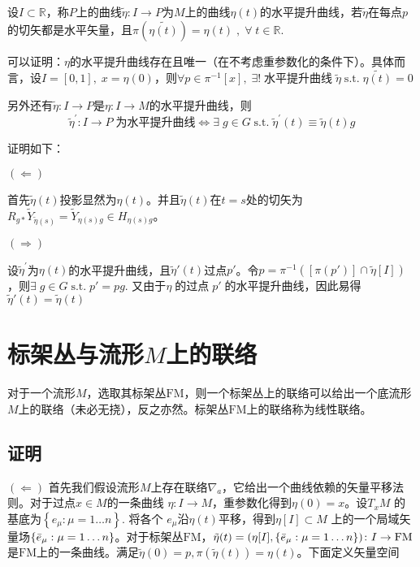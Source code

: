 \documentclass{ctexbook}
\begin{document}
设$I\subset\mathbb{R}$，称$P$上的曲线$\tilde{\eta}\colon I\to P$为$M$上的曲线$\eta(t)$的水平提升曲线，若$\tilde{\eta}$在每点$p$的切矢都是水平矢量，且$\pi(\tilde{\eta(t)})=\eta(t)\;,\;\forall\;t\in\mathbb{R}$.

可以证明：$\eta$的水平提升曲线存在且唯一（在不考虑重参数化的条件下）。具体而言，设$I=[0,1],\;x=\eta(0)$，则$\forall p\in\pi^{-1}[x],\;\exists!\;\text{水平提升曲线}\;\tilde{\eta}\;\text{s.t.}\;\tilde{\eta(t)}=0$

另外还有$\tilde{\eta}\colon I\to P$是$\eta\colon I\to M$的水平提升曲线，则
\begin{equation}
    \tilde{\eta}^{'}\colon I\to P\;\text{为水平提升曲线}\Leftrightarrow\exists\;g\in G\;\text{s.t.}\;\tilde{\eta}^{'}(t)\equiv\tilde{\eta}(t)g
\end{equation}

证明如下：

$\left(\Leftarrow\right)$ 

首先$\tilde{\eta}(t)$投影显然为$\eta(t)$。并且$\tilde{\eta}(t)$在$t=s$处的切矢为$R_{g*}\tilde{Y}_{\tilde{\eta}(s)}=\tilde{Y}_{\eta(s)g}\in H_{\eta(s)g}$。

$\left(\Rightarrow\right)$ 

设$\tilde{\eta}^{'}$为$\eta(t)$的水平提升曲线，且$\tilde{\eta}'(t)$过点$p'$。令$p=\pi^{-1}([\pi(p')]\cap \tilde{\eta}[I])$，则$\exists\;g\in G\;\text{s.t.}\;p'=pg$. 又由于$\eta\;\text{的过点}\;p'\;\text{的水平提升曲线}$，因此易得$\tilde{\eta}'(t)=\tilde{\eta}(t)$


\section{标架丛与流形$M$上的联络}

对于一个流形$M$，选取其标架丛$\mathrm{FM}$，则一个标架丛上的联络可以给出一个底流形$M$上的联络（未必无挠），反之亦然。标架丛$\mathrm{FM}$上的联络称为线性联络。

\subsection{证明}

$(\Leftarrow)$ 首先我们假设流形$M$上存在联络$\nabla_a$，它给出一个曲线依赖的矢量平移法则。对于过点$x\in M$的一条曲线 $\eta\colon I\to M$，重参数化得到$\eta(0)=x$。设$T_x M$ 的基底为$\left\{e_{\mu}:\mu=1\dots n\right\}$. 将各个  $e_\mu$沿$\eta(t)$平移，得到$\eta[I]\subset M$ 上的一个局域矢量场$\left\{\Bar{e}_{\mu}:\mu=1\dots n\right\}$。对于标架丛$\mathrm{FM}$，$\tilde{\eta}(t)=(\eta[I],\left\{\Bar{e}_{\mu}:\mu=1\dots n\right\})\colon I\to \mathrm{FM}$是$\mathrm{FM}$上的一条曲线。满足$\tilde{\eta}(0)=p,\pi(\tilde{\eta}(t))=\eta(t)$。下面定义矢量空间
\end{document}
